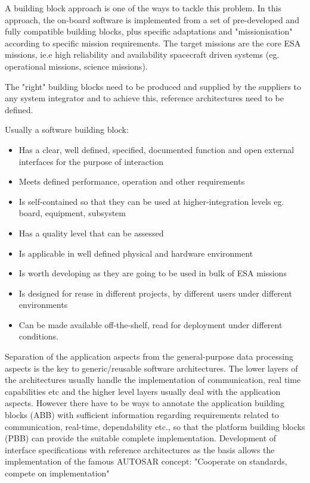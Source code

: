 A building block approach is one of the ways to tackle this problem. In this approach, the on-board software is implemented from a set of pre-developed and fully compatible building blocks, plus specific adaptations and "missionisation" according to specific mission requirements. The target missions are the core ESA missions, ie.e high reliability and availability spacecraft driven systems (eg. operational missions, science missions).

The "right" building blocks need to be produced and supplied by the suppliers to any system integrator and to achieve this, reference architectures need to be defined.

Usually a software building block:
\begin{itemize}
\item Has a clear, well defined, specified, documented function and open external interfaces for the purpose of interaction
\item Meets defined performance, operation and other requirements
\item Is self-contained so that they can be used at higher-integration levels eg. board, equipment, subsystem 
\item Has a quality level that can be assessed
\item Is applicable in well defined physical and hardware environment
\item Is worth developing as they are going to be used in bulk of ESA missions
\item Is designed for reuse in different projects, by different users under different environments
\item Can be made available off-the-shelf, read for deployment under different conditions.  
\end{itemize}

Separation of the application aspects from the general-purpose data processing aspects is the key to generic/reusable software architectures. The lower layers of the architectures usually handle the implementation of communication, real time capabilities etc and the higher level layers usually deal with the application aspects. However there have to be ways to annotate the application building blocks (ABB) with sufficient information regarding requirements related to communication, real-time, dependability etc., so that the platform building blocks (PBB) can provide the suitable complete implementation. Development of interface specifications with reference architectures as the basis allows the implementation of the famous AUTOSAR concept: "Cooperate on standards, compete on implementation"

